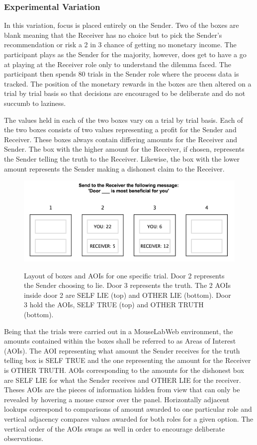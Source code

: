 \documentclass[man, floatsintext]{apa7}
\begin{document}
\subsubsection{Experimental Variation}

In this variation, focus is placed entirely on the Sender. Two of the boxes are blank meaning that the Receiver has no choice but to pick the Sender's recommendation or risk a 2 in 3 chance of getting no monetary income. The participant plays as the Sender for the majority, however, does get to have a go at playing at the Receiver role only to understand the dilemma faced. The participant then spends 80 trials in the Sender role where the process data is tracked. The position of the monetary rewards in the boxes are then altered on a trial by trial basis so that decisions are encouraged to be deliberate and do not succumb to laziness. 

The values held in each of the two boxes vary on a trial by trial basis. Each of the two boxes consists of two values representing a profit for the Sender and Receiver. These boxes always contain differing amounts for the Receiver and Sender. The box with the higher amount for the Receiver, if chosen, represents the Sender telling the truth to the Receiver. Likewise, the box with the lower amount represents the Sender making a dishonest claim to the Receiver.

\begin{figure}[H]
	\centering
	\includegraphics[width=0.75\linewidth]{figures/NOT HIDDEN.png}
	\label{fig:AOIs}
	\caption{Layout of boxes and AOIs for one specific trial. Door 2 represents the Sender choosing to lie. Door 3 represents the truth. The 2 AOIs inside door 2 are SELF LIE (top) and OTHER LIE (bottom). Door 3 hold the AOIs, SELF TRUE (top) and OTHER TRUTH (bottom).}
\end{figure}


Being that the trials were carried out in a MouseLabWeb environment, the amounts contained within the boxes shall be referred to as Areas of Interest (AOIs). The AOI representing what amount the Sender receives for the truth telling box is SELF TRUE and the one representing the amount for the Receiver is OTHER TRUTH. AOIs corresponding to the amounts for the dishonest box are SELF LIE for what the Sender receives and OTHER LIE for the receiver. Theses AOIs are the pieces of information hidden from view that can only be revealed by hovering a mouse cursor over the panel. Horizontally adjacent lookups correspond to comparisons of amount awarded to one particular role and vertical adjacency compares values awarded for both roles for a given option. The vertical order of the AOIs swaps as well in order to encourage deliberate observations.
\end{document}
